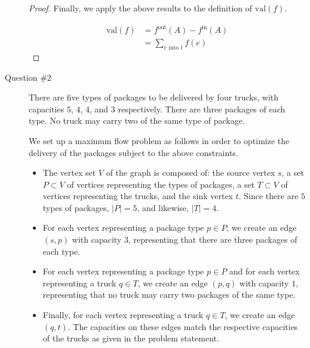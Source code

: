\documentclass[letterpaper,11pt]{article}
\newcommand{\val}{\!\mathrm{val}}
\begin{document}
\begin{description}
\begin{proof}
            Finally, we apply the above results to the definition of
            $\val{(f)}$.

            \begin{align*}
                \val{(f)} &= f^\mathrm{out}(A) - f^\mathrm{in}(A) \\
                          &= \sum_{e \text{ into } t} f(e)
            \end{align*}

        \end{proof}

    \item[Question \#2]
        There are five types of packages to be delivered by four trucks, with
        capacities $5$, $4$, $4$, and $3$ respectively. There are three
        packages of each type. No truck may carry two of the same type of
        package.

        We set up a maximum flow problem as follows in order to optimize the
        delivery of the packages subject to the above constraints.

        \begin{itemize}
            \item
                The vertex set $V$ of the graph is composed of: the source
                vertex $s$, a set $P \subset V$ of vertices representing the
                types of packages, a set $T \subset V$ of vertices representing
                the trucks, and the sink vertex $t$. Since there are $5$ types
                of packages, $|P| = 5$, and likewise, $|T| = 4$.

            \item
                For each vertex representing a package type $p \in P$, we
                create an edge $(s, p)$ with capacity $3$, representing that
                there are three packages of each type.

            \item
                For each vertex representing a package type $p \in P$ and for
                each vertex representing a truck $q \in T$, we create an edge
                $(p, q)$ with capacity $1$, representing that no truck may
                carry two packages of the same type.

            \item
                Finally, for each vertex representing a truck $q \in T$, we
                create an edge $(q, t)$. The capacities on these edges match
                the respective capacities of the trucks as given in the problem
                statement.
        \end{itemize}


\end{description}
\end{document}
